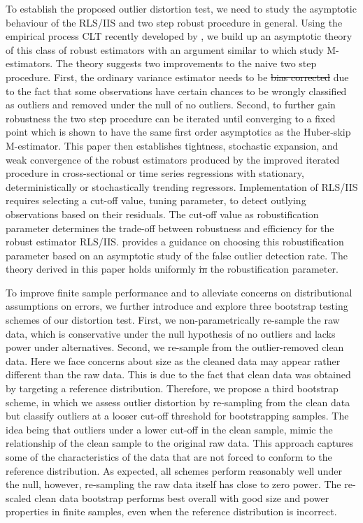 \documentclass[11pt, letterpaper]{article}
\numberwithin{algorithm}{section}
\numberwithin{assumption}{section}
\numberwithin{lemma}{section}
\numberwithin{theorem}{section}
\numberwithin{corollary}{section}
\numberwithin{remark}{section}
\numberwithin{equation}{section}
\numberwithin{figure}{section}
\numberwithin{table}{section}
\providecommand{\DIFadd}[1]{{\protect\color{blue}\uwave{#1}}} %
\providecommand{\DIFdel}[1]{{\protect\color{red}\sout{#1}}}                      %
\providecommand{\DIFaddbegin}{} %
\providecommand{\DIFaddend}{} %
\providecommand{\DIFdelbegin}{} %
\providecommand{\DIFdelend}{} %
\newcommand{\DIFscaledelfig}{0.5}
\newlength{\DIFdelgraphicswidth} %
\newlength{\DIFdelgraphicsheight} %
\newcommand{\DIFaddincludegraphics}[2][]{{\color{blue}\fbox{\DIFOincludegraphics[#1]{#2}}}} %
\newcommand{\DIFdelincludegraphics}[2][]{%
\sbox{\DIFdelgraphicsbox}{\DIFOincludegraphics[#1]{#2}}%
\settoboxwidth{\DIFdelgraphicswidth}{\DIFdelgraphicsbox} %
\settoboxtotalheight{\DIFdelgraphicsheight}{\DIFdelgraphicsbox} %
\scalebox{\DIFscaledelfig}{%
\parbox[b]{\DIFdelgraphicswidth}{\usebox{\DIFdelgraphicsbox}\\[-\baselineskip] \rule{\DIFdelgraphicswidth}{0em}}\llap{\resizebox{\DIFdelgraphicswidth}{\DIFdelgraphicsheight}{%
\setlength{\unitlength}{\DIFdelgraphicswidth}%
\begin{picture}(1,1)%
\thicklines\linethickness{2pt} %
{\color[rgb]{1,0,0}\put(0,0){\framebox(1,1){}}}%
{\color[rgb]{1,0,0}\put(0,0){\line( 1,1){1}}}%
{\color[rgb]{1,0,0}\put(0,1){\line(1,-1){1}}}%
\end{picture}%
}\hspace*{3pt}}} %
} %
\DeclareRobustCommand{\DIFaddbegin}{\DIFOaddbegin \let\includegraphics\DIFaddincludegraphics} %
\DeclareRobustCommand{\DIFaddend}{\DIFOaddend \let\includegraphics\DIFOincludegraphics} %
\DeclareRobustCommand{\DIFdelbegin}{\DIFOdelbegin \let\includegraphics\DIFdelincludegraphics} %
\DeclareRobustCommand{\DIFdelend}{\DIFOaddend \let\includegraphics\DIFOincludegraphics} %
\begin{document}
To establish the proposed outlier distortion test, we need to study the asymptotic behaviour of the RLS/IIS and two step robust procedure in general. Using the empirical process CLT recently developed by \cite{berenguer2019analysis}, we build up an asymptotic theory of this class of robust estimators with an argument similar to \cite{johansen2009analysis, johansen2013outlier, johansen2019boundedness} which study M-estimators. The theory suggests two improvements to the naive two step procedure. First, the ordinary variance estimator needs to be \DIFdelbegin \DIFdel{bias corrected }\DIFdelend \DIFaddbegin \DIFadd{bias-corrected }\DIFaddend due to the fact that some observations have certain chances to be wrongly classified as outliers and removed under the null of no outliers. Second, to further gain robustness the two step procedure can be iterated until converging to a fixed point which is shown to have the same first order asymptotics as the Huber-skip M-estimator. This paper then establishes tightness, stochastic expansion, and weak convergence of the robust estimators produced by the improved iterated procedure in cross-sectional or time series regressions with stationary, deterministically or stochastically trending regressors. Implementation of RLS/IIS requires selecting a cut-off value, \DIFaddbegin \DIFadd{the }\DIFaddend tuning parameter, to detect outlying observations based on their residuals. The cut-off value as robustification parameter determines the trade-off between robustness and efficiency for the robust estimator RLS/IIS. \cite{jiao2020testingoutlier} provides a guidance on choosing this robustification parameter based on an asymptotic study of the false outlier detection rate. The theory derived in this paper holds uniformly \DIFdelbegin \DIFdel{in }\DIFdelend \DIFaddbegin \DIFadd{for }\DIFaddend the robustification parameter.

To improve finite sample performance and to alleviate concerns on distributional assumptions on errors, we further introduce and explore three bootstrap testing schemes of our distortion test. First, we non-parametrically re-sample the raw data, which is conservative under the null hypothesis of no outliers and lacks power under alternatives. Second, we re-sample from the outlier-removed clean data. Here we face concerns about size as the cleaned data may appear rather different than the raw data. This is due to the fact that clean data was obtained by targeting a reference distribution. Therefore, we propose a third bootstrap scheme, in which we assess outlier distortion by re-sampling from the clean data but classify outliers at a looser cut-off threshold for bootstrapping samples. The idea being that outliers under a lower cut-off in the clean sample, mimic the relationship of the clean sample to the original raw data. This approach captures some of the characteristics of the data that are not forced to conform to the reference distribution. As expected, all schemes perform reasonably well under the null, however, re-sampling the raw data itself has close to zero power. The re-scaled clean data bootstrap performs best overall with good size and power properties in finite samples, even when the reference distribution is incorrect.
\end{document}
